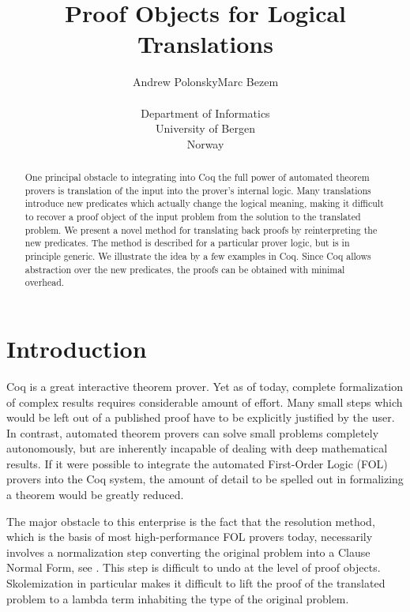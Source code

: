 \documentclass[a4paper,11pt]{article}
\title{Proof Objects for Logical Translations}
\author{Andrew Polonsky\quad\quad\quad Marc Bezem\\\\
Department of Informatics\\University of Bergen\\Norway}
\date{}
\begin{document}
\theoremstyle{plain} 
\newtheorem{thm}{Theorem}
\theoremstyle{definition}
\newtheorem{dfn}[thm]{Definition}
\newtheorem{ex}[thm]{Example}
\newtheorem{fact}[thm]{Fact}
\maketitle

\begin{abstract}
\noindent
One principal obstacle to integrating into Coq the full power
of automated theorem provers is translation of the input into
the prover's internal logic.  Many translations introduce new
predicates which actually change the logical meaning,
making it difficult to recover a proof object of
the input problem from the solution to the translated problem.
We present a novel method for translating back proofs by
reinterpreting the new predicates.  The method is described
for a particular prover logic, but is in principle generic.  We
illustrate the idea by a few examples in Coq.  Since
Coq allows abstraction over the new predicates, the proofs
can be obtained with minimal overhead.

\end{abstract}

\section{Introduction}

Coq is a great interactive theorem prover. Yet as of today, complete
formalization of complex results requires considerable amount of effort.  Many small
steps which would be left out of a published proof have to be explicitly justified
by the user.  In contrast, automated theorem provers can solve small problems
completely autonomously, but are inherently incapable of 
dealing with deep mathematical results.  If it were possible to integrate
the automated First-Order Logic (FOL) provers into the Coq system, 
the amount of detail to be
spelled out in formalizing a theorem would be greatly reduced.

The major obstacle to this enterprise is the fact that 
the resolution method, which is the basis of most high-performance FOL provers
today, necessarily involves a normalization step converting the original problem into a
Clause Normal Form, see \cite[pp.19--99,273--333]{HandbookAR}.  
This step is difficult to undo at the level of proof
objects.  Skolemization in particular makes it difficult to lift the proof of the
translated problem to a lambda term inhabiting the type of the original problem.
\end{document}
